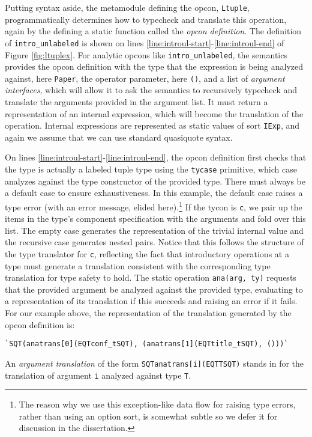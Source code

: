 Putting syntax aside, the metamodule defining the opcon, \lstinline{Ltuple}, programmatically determines how to typecheck and translate this operation, again by the defining a static function called the \emph{opcon definition}. The definition of \lstinline{intro_unlabeled} is shown on lines \ref{line:introul-start}-\ref{line:introul-end} of Figure \ref{fig:ltuplex}. For analytic opcons like \lstinline{intro_unlabeled}, the semantics provides the opcon definition  with the type that the expression is being analyzed against, here \lstinline{Paper}, the operator parameter, here \lstinline{()}, and a list of \emph{argument interfaces}, which will allow it to ask the semantics to recursively typecheck and translate the arguments provided in the argument list. It must return a representation of an  internal expression, which will become the translation of the operation. Internal expressions are represented as static values of sort \lstinline{IExp}, and again we assume that we can use standard quasiquote syntax. 

On lines \ref{line:introul-start}-\ref{line:introul-end}, the opcon definition first checks that the type is actually a labeled tuple type using the \lstinline{tycase} primitive, which case analyzes against the type constructor of the provided type. There must always be a default case to ensure exhaustiveness. In this example, the default case raises a type error (with an error message, elided here).\footnote{The reason why we use this exception-like data flow for raising type errors, rather than using an option sort, is somewhat subtle so we defer it for discussion in the dissertation.} If the tycon is \lstinline{c}, we pair up the items in the type's component specification with the arguments and fold over this list. The empty case generates the representation of the trivial internal value and the recursive case generates nested pairs. Notice that this follows the structure of the type translator for \lstinline{c}, reflecting the fact that introductory operations at a type must generate a translation consistent with the corresponding type translation for type safety to hold. The static operation \lstinline{ana(arg, ty)} requests that the provided argument be analyzed against the provided type, evaluating to a representation of its translation if this succeeds and raising an error if it fails. For our example above, the representation of the translation generated by the opcon definition is:
\begin{lstlisting}[numbers=none]
`SQT(anatrans[0](EQTconf_tSQT), (anatrans[1](EQTtitle_tSQT), ()))`
\end{lstlisting}
An \emph{argument translation} of the form \lstinline{SQTanatrans[i](EQTTSQT)} stands in for the translation of argument \lstinline{i} analyzed against type \lstinline{T}.

